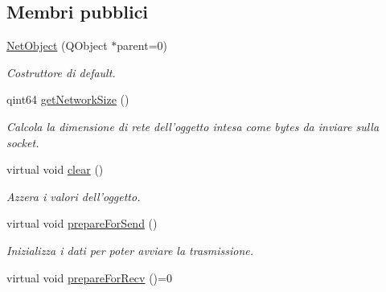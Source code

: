 \subsection*{Membri pubblici}
\begin{DoxyCompactItemize}
\item 
\hyperlink{class_k_cloud_1_1_net_object_aa793065ebe235c8173e70ee041353345}{Net\-Object} (Q\-Object $\ast$parent=0)
\begin{DoxyCompactList}\small\item\em Costruttore di default. \end{DoxyCompactList}\item 
qint64 \hyperlink{class_k_cloud_1_1_net_object_a44835b59c4c1658e3529a8e752f3a3ca}{get\-Network\-Size} ()
\begin{DoxyCompactList}\small\item\em Calcola la dimensione di rete dell'oggetto intesa come bytes da inviare sulla socket. \end{DoxyCompactList}\item 
virtual void \hyperlink{class_k_cloud_1_1_net_object_a19494b9dd2318325504a5d8ccc242c48}{clear} ()
\begin{DoxyCompactList}\small\item\em Azzera i valori dell'oggetto. \end{DoxyCompactList}\item 
virtual void \hyperlink{class_k_cloud_1_1_net_object_abe21fc2011a6d6565d464cec00400c5d}{prepare\-For\-Send} ()
\begin{DoxyCompactList}\small\item\em Inizializza i dati per poter avviare la trasmissione. \end{DoxyCompactList}\item 
\hypertarget{class_k_cloud_1_1_net_object_a38f4b8f98f670115b11f10aad9752783}{virtual void \hyperlink{class_k_cloud_1_1_net_object_a38f4b8f98f670115b11f10aad9752783}{prepare\-For\-Recv} ()=0}\label{class_k_cloud_1_1_net_object_a38f4b8f98f670115b11f10aad9752783}


\end{DoxyCompactItemize}
